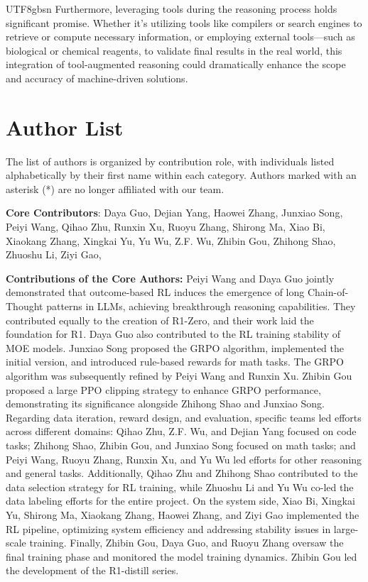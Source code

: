 \documentclass[11pt, a4paper, logo, copyright, nonumbering]{deepseek}
\begin{document}
\begin{CJK*}{UTF8}{gbsn}
 Furthermore, leveraging tools during the reasoning process holds significant promise. Whether it’s utilizing tools like compilers or search engines to retrieve or compute necessary information, or employing external tools—such as biological or chemical reagents, to validate final results in the real world, this integration of tool-augmented reasoning could dramatically enhance the scope and accuracy of machine-driven solutions.

\section{Author List}
The list of authors is organized by contribution role, with individuals listed alphabetically by their first name within each category. Authors marked with an asterisk (*) are no longer affiliated with our team.

\textbf{Core Contributors}:
Daya Guo,
Dejian Yang,
Haowei Zhang,
Junxiao Song,
Peiyi Wang,
Qihao Zhu,
Runxin Xu,
Ruoyu Zhang,
Shirong Ma,
Xiao Bi,
Xiaokang Zhang,
Xingkai Yu,
Yu Wu,
Z.F. Wu,
Zhibin Gou,
Zhihong Shao,
Zhuoshu Li,
Ziyi Gao,

\textbf{Contributions of the Core Authors: }
Peiyi Wang and Daya Guo jointly demonstrated that outcome-based RL induces the emergence of long Chain-of-Thought patterns in LLMs, achieving breakthrough reasoning capabilities. They contributed equally to the creation of R1-Zero, and their work laid the foundation for R1. Daya Guo also contributed to the RL training stability of MOE models. Junxiao Song proposed the GRPO algorithm, implemented the initial version, and introduced rule-based rewards for math tasks. The GRPO algorithm was subsequently refined by Peiyi Wang and Runxin Xu. Zhibin Gou proposed a large PPO clipping strategy to enhance GRPO performance,  demonstrating its significance alongside Zhihong Shao and Junxiao Song.
Regarding data iteration, reward design, and evaluation, specific teams led efforts across different domains: Qihao Zhu, Z.F. Wu, and Dejian Yang focused on code tasks; Zhihong Shao, Zhibin Gou, and Junxiao Song focused on math tasks; and Peiyi Wang, Ruoyu Zhang, Runxin Xu, and Yu Wu led efforts for other reasoning and general tasks. Additionally, Qihao Zhu and Zhihong Shao contributed to the data selection strategy for RL training, while Zhuoshu Li and Yu Wu co-led the data labeling efforts for the entire project.
On the system side, Xiao Bi, Xingkai Yu, Shirong Ma, Xiaokang Zhang, Haowei Zhang, and Ziyi Gao implemented the RL pipeline, optimizing system efficiency and addressing stability issues in large-scale training. Finally, Zhibin Gou, Daya Guo, and Ruoyu Zhang oversaw the final training phase and monitored the model training dynamics. Zhibin Gou led the development of the R1-distill series.


\end{CJK*}
\end{document}
